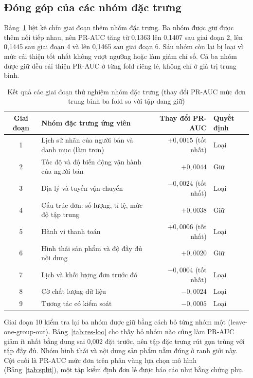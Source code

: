\documentclass[12pt,a4paper]{report}
\begin{document}
\subsection{Đóng góp của các nhóm đặc trưng}\label{subsec:tab-features}

Bảng~\ref{tab:res-phases} liệt kê chín giai đoạn thêm nhóm đặc trưng. Ba nhóm được giữ được thêm nối tiếp nhau, nên PR-AUC tăng từ 0,1363 lên 0,1407 sau giai đoạn 2, lên 0,1445 sau giai đoạn 4 và lên 0,1465 sau giai đoạn 6. Sáu nhóm còn lại bị loại vì mức cải thiện tốt nhất không vượt ngưỡng hoặc làm giảm chỉ số. Cả ba nhóm được giữ đều cải thiện PR-AUC ở từng fold riêng lẻ, không chỉ ở giá trị trung bình.

\begin{table}[htbp]\centering\small
\caption{Kết quả các giai đoạn thử nghiệm nhóm đặc trưng (thay đổi PR-AUC mức đơn trung bình ba fold so với tập đang giữ)}\label{tab:res-phases}
\begin{tabular}{clrl}
\toprule
Giai đoạn & Nhóm đặc trưng ứng viên & Thay đổi PR-AUC & Quyết định \\
\midrule
1 & Lịch sử nhãn của người bán và danh mục (làm trơn) & $+0{,}0015$ (tốt nhất) & Loại \\
2 & Tốc độ và độ biến động vận hành của người bán & $+0{,}0044$ & Giữ \\
3 & Địa lý và tuyến vận chuyển & $-0{,}0024$ (tốt nhất) & Loại \\
4 & Cấu trúc đơn: số lượng, tỉ lệ, mức độ tập trung & $+0{,}0038$ & Giữ \\
5 & Hành vi thanh toán & $+0{,}0006$ (tốt nhất) & Loại \\
6 & Hình thái sản phẩm và độ đầy đủ nội dung & $+0{,}0020$ & Giữ \\
7 & Lịch và khối lượng đơn trước đó & $-0{,}0004$ (tốt nhất) & Loại \\
8 & Cờ chất lượng dữ liệu & $-0{,}0024$ & Loại \\
9 & Tương tác có kiểm soát & $-0{,}0005$ & Loại \\
\bottomrule
\end{tabular}
\end{table}

Giai đoạn 10 kiểm tra lại ba nhóm được giữ bằng cách bỏ từng nhóm một (leave-one-group-out). Bảng~\ref{tab:res-loo} cho thấy bỏ nhóm nào cũng làm PR-AUC giảm ít nhất bằng dung sai 0,002 đặt trước, nên tập đặc trưng rút gọn trùng với tập đầy đủ. Nhóm hình thái và nội dung sản phẩm nằm đúng ở ranh giới này. Cột cuối là PR-AUC mức đơn trên phân vùng lựa chọn mô hình (Bảng~\ref{tab:split}), một tập kiểm định đơn lẻ được báo cáo như bằng chứng phụ.
\end{document}
